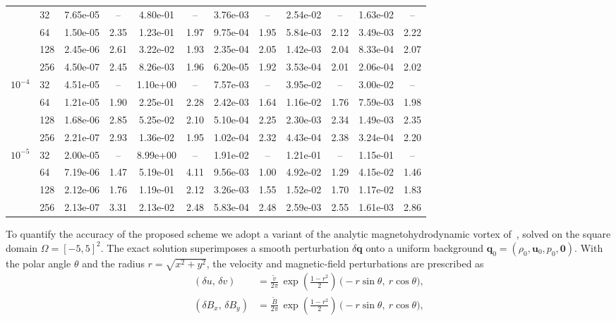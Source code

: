 \documentclass[a4paper,fleqn]{cas-sc}
\theoremstyle{definition}
\theoremstyle{remark}
\begin{document}
\begin{table}[t]
\begin{tabular}{ll cc cc cc cc cc}
 & 32  & 7.65e-05 & --   & 4.80e-01 & --   & 3.76e-03 & --   & 2.54e-02 & --   & 1.63e-02 & --   \\
 & 64  & 1.50e-05 & 2.35 & 1.23e-01 & 1.97 & 9.75e-04 & 1.95 & 5.84e-03 & 2.12 & 3.49e-03 & 2.22 \\
 & 128 & 2.45e-06 & 2.61 & 3.22e-02 & 1.93 & 2.35e-04 & 2.05 & 1.42e-03 & 2.04 & 8.33e-04 & 2.07 \\
 & 256 & 4.50e-07 & 2.45 & 8.26e-03 & 1.96 & 6.20e-05 & 1.92 & 3.53e-04 & 2.01 & 2.06e-04 & 2.02 \\
\multirow[t]{4}{*}{$10^{-4}$}
 & 32  & 4.51e-05 & --   & 1.10e+00 & --   & 7.57e-03 & --   & 3.95e-02 & --   & 3.00e-02 & --   \\
 & 64  & 1.21e-05 & 1.90 & 2.25e-01 & 2.28 & 2.42e-03 & 1.64 & 1.16e-02 & 1.76 & 7.59e-03 & 1.98 \\
 & 128 & 1.68e-06 & 2.85 & 5.25e-02 & 2.10 & 5.10e-04 & 2.25 & 2.30e-03 & 2.34 & 1.49e-03 & 2.35 \\
 & 256 & 2.21e-07 & 2.93 & 1.36e-02 & 1.95 & 1.02e-04 & 2.32 & 4.43e-04 & 2.38 & 3.24e-04 & 2.20 \\
\multirow[t]{4}{*}{$10^{-5}$}
 & 32  & 2.00e-05 & --   & 8.99e+00 & --   & 1.91e-02 & --   & 1.21e-01 & --   & 1.15e-01 & --   \\
 & 64  & 7.19e-06 & 1.47 & 5.19e-01 & 4.11 & 9.56e-03 & 1.00 & 4.92e-02 & 1.29 & 4.15e-02 & 1.46 \\
 & 128 & 2.12e-06 & 1.76 & 1.19e-01 & 2.12 & 3.26e-03 & 1.55 & 1.52e-02 & 1.70 & 1.17e-02 & 1.83 \\
 & 256 & 2.13e-07 & 3.31 & 2.13e-02 & 2.48 & 5.83e-04 & 2.48 & 2.59e-03 & 2.55 & 1.61e-03 & 2.86 \\
\bottomrule
\end{tabular}
\end{table}
To quantify the accuracy of the proposed scheme we adopt a variant of the
analytic magnetohydrodynamic vortex of~\cite{accuracyvortex, BoscheriThomann2024}, solved on the square
domain $\Omega = [-5,5]^2$. The exact solution superimposes a smooth
perturbation $\delta\mathbf{q}$ onto a uniform background
$\mathbf{q}_0 = (\rho_0, \mathbf{u}_0, p_0, \mathbf{0})$. With the polar angle
$\theta$ and the radius $r=\sqrt{x^2+y^2}$, the velocity and magnetic-field
perturbations are prescribed as
%
\begin{align}
(\delta u,\, \delta v)
  &= \frac{\tilde{v}}{2\pi}\,
     \exp\!\left(\frac{1-r^{2}}{2}\right)\,
     \bigl(-r\sin\theta,\ r\cos\theta\bigr), \label{eq:vortex_vel}\\[2pt]
(\delta B_x,\, \delta B_y)
  &= \frac{\tilde{B}}{2\pi}\,
     \exp\!\left(\frac{1-r^{2}}{2}\right)\,
     \bigl(-r\sin\theta,\ r\cos\theta\bigr), \label{eq:vortex_mag}
\end{align}
\end{document}
